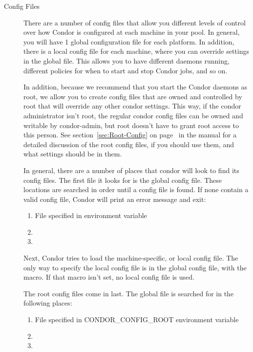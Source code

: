 \begin{description}
\item[Config Files]
There are a number of config files that allow you different
levels of control over how Condor is configured at each machine in
your pool.  In general, you will have 1 global configuration file for
each platform.  In addition, there is a local config file for each
machine, where you can override settings in the global file.  This
allows you to have different daemons running, different policies for
when to start and stop Condor jobs, and so on.  

In addition, because we recommend that you start the Condor daemons as
root, we allow you to create config files that are owned and
controlled by root that will override any other condor settings.  This
way, if the condor administrator isn't root, the regular condor config
files can be owned and writable by condor-admin, but root doesn't have
to grant root access to this person.  See
section~\ref{sec:Root-Config} on page~\pageref{sec:Root-Config} in the
manual for a detailed discussion of the root config files, if you
should use them, and what settings should be in them.

In general, there are a number of places that condor will look to find
its config files.  The first file it looks for is the global config
file.  These locations are searched in order until a config file is
found.  If none contain a valid config file, Condor will print an
error message and exit:
\begin{enumerate}
   \item File specified in  environment variable
   \item {}
   \item {}
\end{enumerate}

Next, Condor tries to load the machine-specific, or local config file.
The only way to specify the local config file is in the global config
file, with the  macro.  If that macro isn't
set, no local config file is used.

The root config files come in last.  The global file is searched for
in the following places:
\begin{enumerate}
   \item File specified in CONDOR\_CONFIG\_ROOT environment variable
   \item {}
   \item {}
\end{enumerate}


\end{description}
